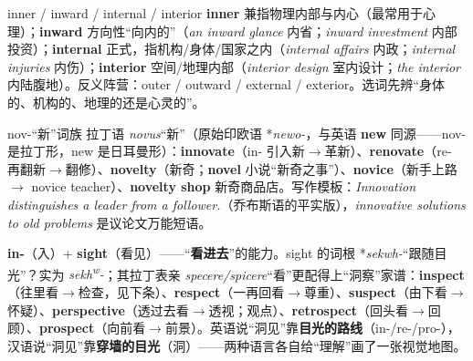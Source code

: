 \documentclass[../main.tex]{subfiles}
\begin{document}
\begin{gram}{inner / inward / internal / interior}
\textbf{inner} 兼指物理内部与内心（最常用于心理）；\textbf{inward} 方向性“向内的”（\textit{an inward glance} 内省；\textit{inward investment} 内部投资）；\textbf{internal} 正式，指机构/身体/国家之内（\textit{internal affairs} 内政；\textit{internal injuries} 内伤）；\textbf{interior} 空间/地理内部（\textit{interior design} 室内设计；\textit{the interior} 内陆腹地）。反义阵营：outer / outward / external / exterior。选词先辨“身体的、机构的、地理的还是心灵的”。
\end{gram}



\begin{gram}{nov-“新”词族}
拉丁语 \textit{novus}“新”（原始印欧语 *\textit{newo-}，与英语 \textbf{new} 同源——nov- 是拉丁形，new 是日耳曼形）：\textbf{innovate}（in- 引入新$\to$革新）、\textbf{renovate}（re- 再翻新$\to$翻修）、\textbf{novelty}（新奇；\textbf{novel} 小说“新奇之事”）、\textbf{novice}（新手上路$\to$ novice teacher）、\textbf{novelty shop} 新奇商品店。写作模板：\textit{Innovation distinguishes a leader from a follower.}（乔布斯语的平实版），\textit{innovative solutions to old problems} 是议论文万能短语。
\end{gram}



\begin{origin}
\textbf{in-}（入）+ \textbf{sight}（看见）——“\textbf{看进去}”的能力。sight 的词根 *\textit{sekwh-}“跟随目光”？实为 \textit{sekh\textsuperscript{w}-}；其拉丁表亲 \textit{specere/spicere}“看”更配得上“洞察”家谱：\textbf{inspect}（往里看$\to$检查，见下条）、\textbf{respect}（一再回看$\to$尊重）、\textbf{suspect}（由下看$\to$怀疑）、\textbf{perspective}（透过去看$\to$透视；观点）、\textbf{retrospect}（回头看$\to$回顾）、\textbf{prospect}（向前看$\to$前景）。英语说“洞见”靠\textbf{目光的路线}（in-/re-/pro-），汉语说“洞见”靠\textbf{穿墙的目光}（洞）——两种语言各自给“理解”画了一张视觉地图。
\end{origin}
\end{document}
